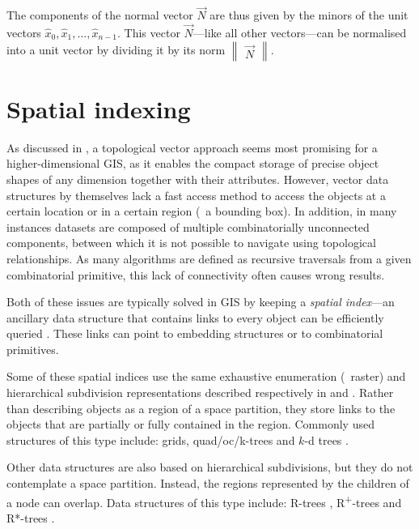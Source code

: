 The components of the normal vector $\vec{N}$ are thus given by the minors of the unit vectors $\hat{x}_0, \hat{x}_1, \ldots, \hat{x}_{n-1}$.
This vector $\vec{N}$---like all other vectors---can be normalised into a unit vector by dividing it by its norm $\begin{Vmatrix} \vec{N} \end{Vmatrix}$.

\section{Spatial indexing}
\label{se:spatial-indexing}

As discussed in , a topological vector approach seems most promising for a higher-dimensional GIS, as it enables the compact storage of precise object shapes of any dimension together with their attributes.
However, vector data structures by themselves lack a fast access method to access the objects at a certain location or in a certain region (\eg\ a bounding box).
In addition, in many instances datasets are composed of multiple combinatorially unconnected components, between which it is not possible to navigate using topological relationships.
As many algorithms are defined as recursive traversals from a given combinatorial primitive, this lack of connectivity often causes wrong results.

Both of these issues are typically solved in GIS by keeping a \emph{spatial index}---an ancillary data structure that contains links to every object can be efficiently queried \citep{vanOosterom99}.
These links can point to embedding structures or to combinatorial primitives.

Some of these spatial indices use the same exhaustive enumeration (\ie\ raster) and hierarchical subdivision representations described respectively in  and .
Rather than describing objects as a region of a space partition, they store links to the objects that are partially or fully contained in the region.
Commonly used structures of this type include: grids, quad/oc/k-trees \citep{Finkel74,Meagher80,Yau83,Jackins83} and $k$-d trees \citep{Bentley75}.

Other data structures are also based on hierarchical subdivisions, but they do not contemplate a space partition.
Instead, the regions represented by the children of a node can overlap.
Data structures of this type include: R-trees \citep{Guttman84}, R\textsuperscript{+}-trees \citep{Sellis87} and R*-trees \citep{Beckmann90}.

